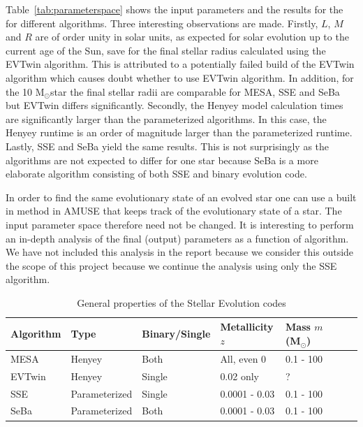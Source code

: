 \documentclass{aa}
\newcommand{\Sun}[0]{\ensuremath{_{\odot}}}
\begin{document}
Table~\ref{tab:parameterspace} shows the input parameters and the results for the for different algorithms. Three interesting observations are made. Firstly, $L$, $M$ and $R$ are of order unity in solar units, as expected for solar evolution up to the current age of the Sun, save for the final stellar radius calculated using the EVTwin algorithm. This is attributed to a potentially failed build of the EVTwin algorithm which causes doubt whether to use EVTwin algorithm. In addition, for the 10 M\Sun star the final stellar radii are comparable for MESA, SSE and SeBa but EVTwin differs significantly. Secondly, the Henyey model calculation times are significantly larger than the parameterized algorithms. In this case, the Henyey runtime is an order of magnitude larger than the parameterized runtime. Lastly, SSE and SeBa yield the same results. This is not surprisingly as the algorithms are not expected to differ for one star because SeBa is a more elaborate algorithm consisting of both SSE and binary evolution code.

In order to find the same evolutionary state of an evolved star one can use a built in method in AMUSE that keeps track of the evolutionary state of a star. The input parameter space therefore need not be changed. It is interesting to perform an in-depth analysis of the final (output) parameters as a function of algorithm. We have not included this analysis in the report because we consider this outside the scope of this project because we continue the analysis using only the SSE algorithm.

\begin{table}
    \caption{General properties of the Stellar Evolution codes \citep{AMUSEdocumentation}}
    \label{tab:algorithms}
    \centering
    \begin{tabular}{l l l l l l l l }
        \hline\hline
        Algorithm & Type & Binary/Single & Metallicity $z$ & Mass $m$ (M\Sun) \\
        \hline
        MESA & Henyey & Both & All, even 0 & 0.1 - 100 \\
        EVTwin & Henyey & Single\footnotemark[1] & 0.02 only & ? \\
        SSE & Parameterized & Single & 0.0001 - 0.03 & 0.1 - 100 \\
        SeBa & Parameterized & Both & 0.0001 - 0.03 & 0.1 - 100 \\
        \hline
    \end{tabular}
\end{table}
\addtocounter{footnote}{1}
\footnotetext[\value{footnote}]{Binaries are not yet available in AMUSE EVTwin Interface.}
\end{document}
